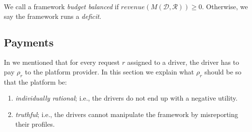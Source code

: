 We call a framework \emph{budget balanced} if $revenue(M(\mathcal{D}, \mathcal{R})) \geq 0$. Otherwise, we say the framework runs a \emph{deficit}.

\subsection{Payments}
In  we mentioned that for every request $r$ assigned to a driver, the driver has to pay $\rho_r$ to the platform provider. In this section we explain what $\rho_r$ should be so that the platform be:
\begin{enumerate}
\item \emph{individually rational}; i.e., the drivers do not end up with a negative utility.
\item \emph{truthful}; i.e., the drivers cannot manipulate the framework by misreporting their profiles.
\end{enumerate}

